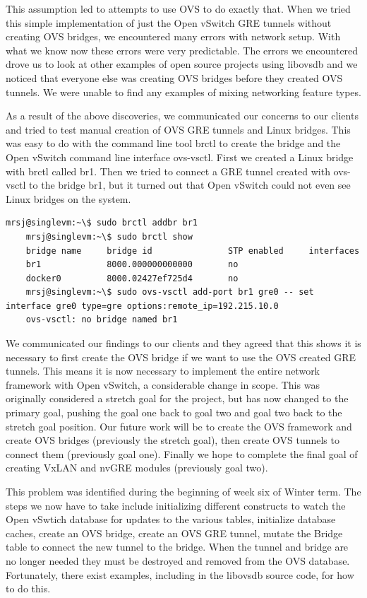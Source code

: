 \documentclass[10pt,onecolumn,journal,draftclsnofoot]{IEEEtran}
\begin{document}
This assumption led to attempts to use OVS to do exactly that. When we tried
this simple implementation of just the Open vSwitch GRE tunnels without
creating OVS bridges, we encountered many errors with network setup. With what
we know now these errors were very predictable. The errors we encountered drove
us to look at other examples of open source projects using libovsdb and we
noticed that everyone else was creating OVS bridges before they created OVS
tunnels. We were unable to find any examples of mixing networking feature
types.

As a result of the above discoveries, we communicated our concerns to our
clients and tried to test manual creation of OVS GRE tunnels and Linux bridges.
This was easy to do with the command line tool brctl to create the bridge and
the Open vSwitch command line interface ovs-vsctl. First we created a Linux
bridge with brctl called br1. Then we tried to connect a GRE tunnel created
with ovs-vsctl to the bridge br1, but it turned out that Open vSwitch could not
even see Linux bridges on the system.

\begin{lstlisting}[caption=No Linux Bridge and OVS Tunnel]
	mrsj@singlevm:~\$ sudo brctl addbr br1
	mrsj@singlevm:~\$ sudo brctl show
	bridge name     bridge id               STP enabled     interfaces
	br1             8000.000000000000       no
	docker0         8000.02427ef725d4       no
	mrsj@singlevm:~\$ sudo ovs-vsctl add-port br1 gre0 -- set interface gre0 type=gre options:remote_ip=192.215.10.0
	ovs-vsctl: no bridge named br1
\end{lstlisting}

We communicated our findings to our clients and they agreed that this shows it
is necessary to first create the OVS bridge if we want to use the OVS created
GRE tunnels. This means it is now necessary to implement the entire network
framework with Open vSwitch, a considerable change in scope. This was
originally considered a stretch goal for the project, but has now changed to
the primary goal, pushing the goal one back to goal two and goal two back to
the stretch goal position. Our future work will be to create the OVS framework
and create OVS bridges (previously the stretch goal), then create OVS tunnels
to connect them (previously goal one). Finally we hope to complete the final
goal of creating VxLAN and nvGRE modules (previously goal two).

This problem was identified during the beginning of week six of Winter term.
The steps we now have to take include initializing different constructs to
watch the Open vSwtich database for updates to the various tables, initialize
database caches, create an OVS bridge, create an OVS GRE tunnel, mutate the
Bridge table to connect the new tunnel to the bridge. When the tunnel and
bridge are no longer needed they must be destroyed and removed from the OVS
database. Fortunately, there exist examples, including in the libovsdb source
code, for how to do this.
\end{document}
